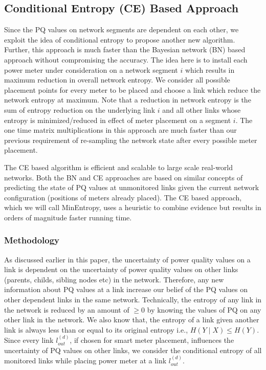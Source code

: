 \subsection{Conditional Entropy (CE) Based Approach}
Since the PQ values on network segments are dependent on each other, we exploit the idea of conditional entropy to propose another new algorithm. Further, this approach is much faster than the Bayesian network (BN) based approach without compromising the accuracy. The idea here is to install each power meter under consideration on a network segment $i$ which results in maximum reduction in overall network entropy. We consider all possible placement points for every meter to be placed and choose a link which reduce the network entropy at maximum. Note that a reduction in network entropy is the sum of entropy reduction on the underlying link $i$ and all other links whose entropy is minimized/reduced in effect of meter placement on a segment $i$. The one time matrix multiplications in this approach are much faster than our previous requirement of re-sampling the network state after every possible meter placement.

The CE based algorithm is efficient and scalable to large scale real-world networks. Both the BN and CE approaches are based on similar concepts of predicting the state of PQ values at unmonitored links given the current network configuration (positions of meters already placed). The CE based approach, which we will call MinEntropy, uses a heuristic to combine evidence but results in orders of magnitude faster running time.

\subsubsection{Methodology}
As discussed earlier in this paper, the uncertainty of power quality values on a link is dependent on the uncertainty of power quality values on other links (parents, childs, sibling nodes etc) in the network. Therefore, any new information about PQ values at a link increase our belief of the PQ values on other dependent links in the same network. Technically, the entropy of any link in the network is reduced by an amount of $\ge0$ by knowing the values of PQ on any other link in the network. We also know that, the entropy of a link given another link is always less than or equal to its original entropy i.e., $H(Y \mid X) \leq H(Y)$. Since every link $l_{out}^{(d)}$, if chosen for smart meter placement, influences the uncertainty of PQ values on other links, we consider the conditional entropy of all monitored links while placing power meter at a link $l_{out}^{(d)}$.


